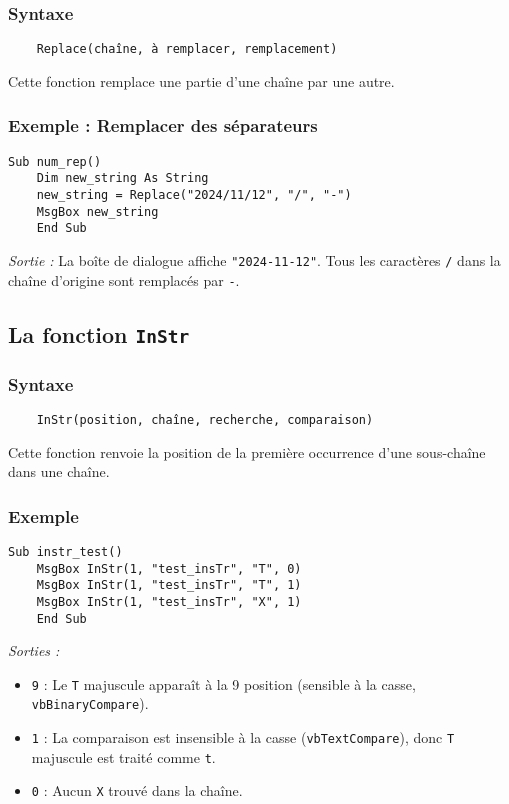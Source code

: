 \documentclass[a4paper,12pt]{report}
\begin{document}
\subsubsection{Syntaxe}
\begin{verbatim}
	Replace(chaîne, à remplacer, remplacement)
\end{verbatim}

Cette fonction remplace une partie d'une chaîne par une autre.

\subsubsection{Exemple : Remplacer des séparateurs}
\begin{lstlisting}[language=VBScript]
	Sub num_rep()
	Dim new_string As String
	new_string = Replace("2024/11/12", "/", "-")
	MsgBox new_string
	End Sub
\end{lstlisting}

\emph{Sortie :} La boîte de dialogue affiche \texttt{"2024-11-12"}. Tous les caractères \texttt{/} dans la chaîne d'origine sont remplacés par \texttt{-}.

\subsection{La fonction \texttt{InStr}}

\subsubsection{Syntaxe}
\begin{verbatim}
	InStr(position, chaîne, recherche, comparaison)
\end{verbatim}

Cette fonction renvoie la position de la première occurrence d'une sous-chaîne dans une chaîne.

\subsubsection{Exemple}
\begin{lstlisting}[language=VBScript]
	Sub instr_test()
	MsgBox InStr(1, "test_insTr", "T", 0)
	MsgBox InStr(1, "test_insTr", "T", 1)
	MsgBox InStr(1, "test_insTr", "X", 1)
	End Sub
\end{lstlisting}

\emph{Sorties :} 
\begin{itemize}
	\item \texttt{9} : Le \texttt{T} majuscule apparaît à la 9 position (sensible à la casse, \texttt{vbBinaryCompare}).
	\item \texttt{1} : La comparaison est insensible à la casse (\texttt{vbTextCompare}), donc \texttt{T} majuscule est traité comme \texttt{t}.
	\item \texttt{0} : Aucun \texttt{X} trouvé dans la chaîne.
\end{itemize}
\end{document}

